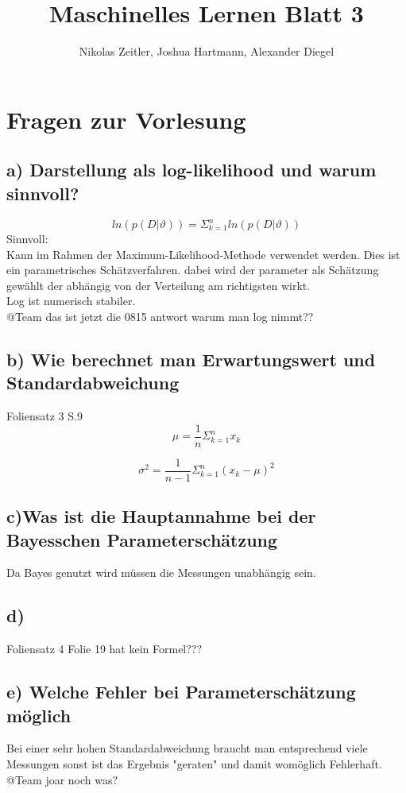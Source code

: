 \documentclass{scrartcl}
\author{Nikolas Zeitler, Joshua Hartmann, Alexander Diegel}
\title{Maschinelles Lernen Blatt 3}
\begin{document}
\maketitle
\section{Fragen zur Vorlesung}
\subsection*{a) Darstellung als log-likelihood und warum sinnvoll?}
\[ ln (p(D|\vartheta)) = \Sigma^n_{k=1} ln (p(D|\vartheta)) \]
Sinnvoll: \\
Kann im Rahmen der Maximum-Likelihood-Methode verwendet werden. Dies ist ein parametrisches Schätzverfahren. dabei wird der parameter als Schätzung gewählt der abhängig von der Verteilung am richtigsten wirkt.\\
Log ist numerisch stabiler.  \\
@Team das ist jetzt die 0815 antwort warum man log nimmt??
\subsection*{b) Wie berechnet man Erwartungswert und Standardabweichung}
Foliensatz 3 S.9 \\
\[\mu = \frac{1}{n}\Sigma^n_{k=1}x_k \]

\[\sigma^2 = \frac{1}{n-1}\Sigma^n_{k=1}(x_k-\mu)^2 \]

\subsection*{c)Was ist die Hauptannahme bei der Bayesschen Parameterschätzung}
Da Bayes genutzt wird müssen die Messungen unabhängig sein. 
\subsection*{d)}
Foliensatz 4 Folie 19 hat kein Formel???

\subsection*{e) Welche Fehler bei Parameterschätzung möglich}
Bei einer sehr hohen Standardabweichung braucht man entsprechend viele Messungen sonst ist das Ergebnis "geraten" und damit womöglich Fehlerhaft.\\
@Team joar noch was?
\end{document}
